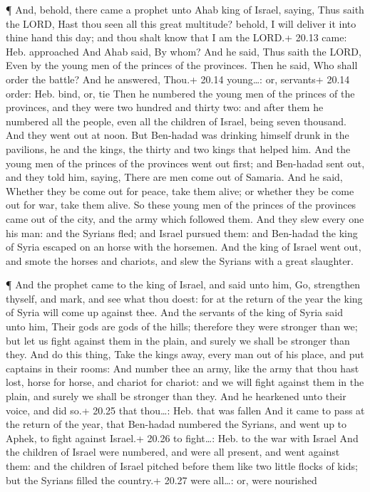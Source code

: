  ¶ And, behold, there came a prophet unto Ahab king of
Israel, saying, Thus saith the LORD, Hast thou seen all this great
multitude? behold, I will deliver it into thine hand this day; and thou
shalt know that I am the LORD.+ 20.13 came: Heb. approached
 And Ahab said, By whom? And he said, Thus saith the LORD,
Even by the young men of the princes of the provinces. Then he said, Who
shall order the battle? And he answered, Thou.+ 20.14 young\ldots: or,
servants+ 20.14 order: Heb. bind, or, tie  Then he numbered
the young men of the princes of the provinces, and they were two hundred
and thirty two: and after them he numbered all the people, even all the
children of Israel, being seven thousand.  And they went
out at noon. But Ben-hadad was drinking himself drunk in the pavilions,
he and the kings, the thirty and two kings that helped him.
 And the young men of the princes of the provinces went out
first; and Ben-hadad sent out, and they told him, saying, There are men
come out of Samaria.  And he said, Whether they be come out
for peace, take them alive; or whether they be come out for war, take
them alive.  So these young men of the princes of the
provinces came out of the city, and the army which followed them.
 And they slew every one his man: and the Syrians fled; and
Israel pursued them: and Ben-hadad the king of Syria escaped on an horse
with the horsemen.  And the king of Israel went out, and
smote the horses and chariots, and slew the Syrians with a great
slaughter.

 ¶ And the prophet came to the king of Israel, and said
unto him, Go, strengthen thyself, and mark, and see what thou doest: for
at the return of the year the king of Syria will come up against thee.
 And the servants of the king of Syria said unto him, Their
gods are gods of the hills; therefore they were stronger than we; but
let us fight against them in the plain, and surely we shall be stronger
than they.  And do this thing, Take the kings away, every
man out of his place, and put captains in their rooms:  And
number thee an army, like the army that thou hast lost, horse for horse,
and chariot for chariot: and we will fight against them in the plain,
and surely we shall be stronger than they. And he hearkened unto their
voice, and did so.+ 20.25 that thou\ldots: Heb. that was fallen
 And it came to pass at the return of the year, that
Ben-hadad numbered the Syrians, and went up to Aphek, to fight against
Israel.+ 20.26 to fight\ldots: Heb. to the war with Israel 
And the children of Israel were numbered, and were all present, and went
against them: and the children of Israel pitched before them like two
little flocks of kids; but the Syrians filled the country.+ 20.27 were
all\ldots: or, were nourished


